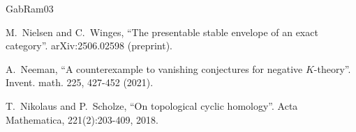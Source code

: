 \documentclass[11pt,leqno]{amsart}
\numberwithin{equation}{section}
\def\coh{\operatorname{coh}}
\newcommand{\perf}{\operatorname{perf}}
\begin{document}
\begin{thebibliography}{GabRam03}

 M.~Nielsen and C.~Winges, ``The presentable stable envelope of an exact category''. arXiv:2506.02598 (preprint).

 A.~Neeman, ``A counterexample to vanishing conjectures for negative $K$-theory''. Invent. math. 225, 427-452 (2021).

 T.~Nikolaus and P.~Scholze, ``On topological cyclic homology''. Acta Mathematica, 221(2):203-409, 2018.












\end{thebibliography}
\end{document}
